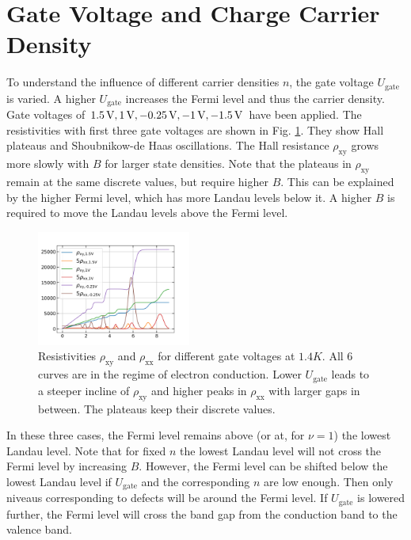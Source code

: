 \section{Gate Voltage and Charge Carrier Density}
To understand the influence of different carrier densities $n$, the gate voltage $U_\text{gate}$ is varied.
A higher $U_\text{gate}$ increases the Fermi level and thus the carrier density.
Gate voltages of $1.5 \,\text V, 1 \,\text V, -0.25 \,\text V, -1 \,\text V, -1.5 \,\text V$ have been applied.
The resistivities with first three gate voltages are shown in Fig. \ref{fig:differentGateVoltagesQHE}.
They show Hall plateaus and Shoubnikow-de Haas oscillations.
The Hall resistance $\rho_\text{xy}$ grows more slowly with $B$ for larger state densities.
Note that the plateaus in $\rho_\text{xy}$ remain at the same discrete values, but require higher $B$.
This can be explained by the higher Fermi level, which has more Landau levels below it.
A higher $B$ is required to move the Landau levels above the Fermi level.
\begin{figure}[h]
    \centering
    \includegraphics[width=0.45\textwidth]{../Images/differentGateVoltagesQHE.png}
    \caption{Resistivities $\rho_\text{xy}$ and $\rho_\text{xx}$ for different gate voltages at $1.4K$. 
    All 6 curves are in the regime of electron conduction.
    Lower $U_\text{gate}$
     leads to a steeper incline of $\rho_\text{xy}$ and higher peaks in $\rho_\text{xx}$ with larger gaps in between.
    The plateaus keep their discrete values.
}
    \label{fig:differentGateVoltagesQHE}
\end{figure}
In these three cases, the Fermi level remains above (or at, for $\nu=1$) the lowest Landau level.
Note that for fixed $n$ the lowest Landau level will not cross the Fermi level by increasing $B$.
However, the Fermi level can be shifted below the lowest Landau level if $U_\text{gate}$ and the corresponding $n$ are low enough.
Then only niveaus corresponding to defects will be around the Fermi level.
If $U_\text{gate}$ is lowered further, the Fermi level will cross the band gap from the conduction band to the valence band.
